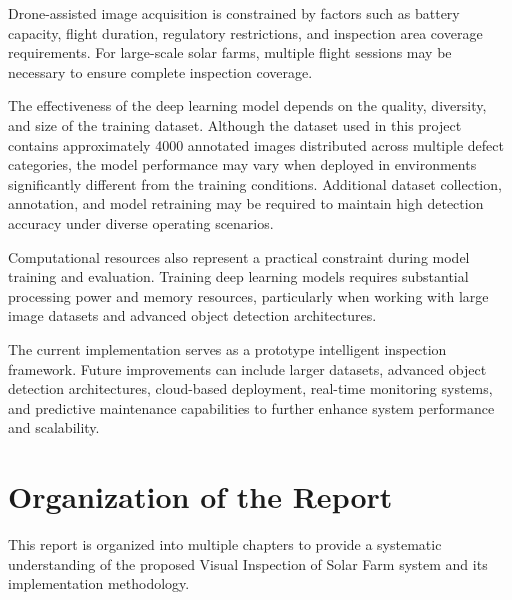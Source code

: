 Drone-assisted image acquisition is constrained by factors such as battery capacity, flight duration, regulatory restrictions, and inspection area coverage requirements. For large-scale solar farms, multiple flight sessions may be necessary to ensure complete inspection coverage.

The effectiveness of the deep learning model depends on the quality, diversity, and size of the training dataset. Although the dataset used in this project contains approximately 4000 annotated images distributed across multiple defect categories, the model performance may vary when deployed in environments significantly different from the training conditions. Additional dataset collection, annotation, and model retraining may be required to maintain high detection accuracy under diverse operating scenarios.

Computational resources also represent a practical constraint during model training and evaluation. Training deep learning models requires substantial processing power and memory resources, particularly when working with large image datasets and advanced object detection architectures.

The current implementation serves as a prototype intelligent inspection framework. Future improvements can include larger datasets, advanced object detection architectures, cloud-based deployment, real-time monitoring systems, and predictive maintenance capabilities to further enhance system performance and scalability.

\section{Organization of the Report}

This report is organized into multiple chapters to provide a systematic understanding of the proposed Visual Inspection of Solar Farm system and its implementation methodology.

